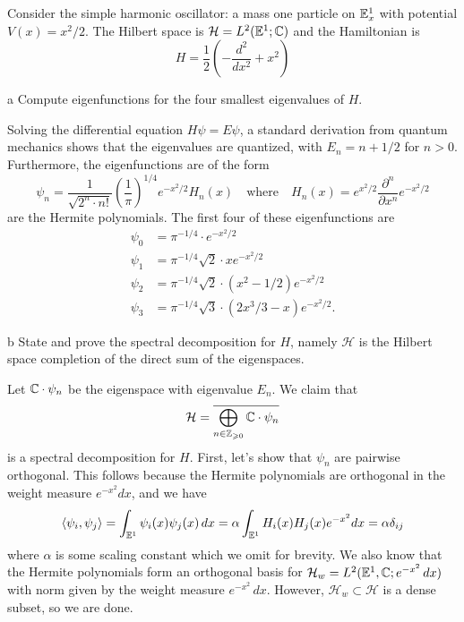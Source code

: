 \documentclass{pset}
\begin{document}
\begin{problem}{2}
  Consider the simple harmonic oscillator: a mass one particle on $\mathbb{E}_x^1$ with potential $V(x) = x^2 /2$. The Hilbert space is $\mathcal{H} = L^2(\mathbb{E}^1; \mathbb{C})$ and the Hamiltonian is
  \[H = \frac{1}{2}\left(-\frac{d^2}{dx^2} + x^2\right)\]
\end{problem}

\begin{parts}
  \begin{part}{a}
    Compute eigenfunctions for the four smallest eigenvalues of $H$.
  \end{part}

  Solving the differential equation $H\psi = E\psi$, a standard derivation from quantum mechanics shows that the eigenvalues are quantized, with $E_n = n+1/2$ for $n>0$. Furthermore, the eigenfunctions are of the form
  \[
    \psi_n = \frac{1}{\sqrt{2^n\cdot n!}}\left(\frac{1}{\pi}\right)^{1/4} e^{-x^2/2} H_n(x)\quad\textrm{where}\quad H_n(x) = e^{x^2/2}\frac{\partial^n}{\partial x^n} e^{-x^2/2}
  \]
  are the Hermite polynomials. The first four of these eigenfunctions are
  \[
    \begin{aligned}
      \psi_0 &= \pi^{-1/4} \cdot e^{-x^2/2}\\
      \psi_1 &= \pi^{-1/4}\sqrt{2}\cdot x e^{-x^2/2}\\
      \psi_2 &= \pi^{-1/4}\sqrt{2}\cdot (x^2-1/2) e^{-x^2/2}\\
      \psi_3 &= \pi^{-1/4}\sqrt{3}\cdot (2x^3/3 - x)e^{-x^2/2}.
    \end{aligned}
  \]

  \begin{part}{b}
    State and prove the spectral decomposition for $H$, namely $\mathcal{H}$ is the Hilbert space completion of the direct sum of the eigenspaces.
  \end{part}
  Let $\mathbb{C}\cdot \psi_n$ be the eigenspace with eigenvalue $E_n$. We claim that
  \[
    \mathcal{H} = \overline{\bigoplus_{n\in \mathbb{Z}_{\geqslant 0}} \mathbb{C} \cdot \psi_n}
  \]
  is a spectral decomposition for $H$. First, let's show that $\psi_n$ are pairwise orthogonal. This follows because the Hermite polynomials are orthogonal in the weight measure $e^{-x^2} dx$, and we have
  \[
    \langle\psi_i, \psi_j\rangle = \int_{\mathbb{E}^1} \psi_i(x)\psi_j(x) \,dx = \alpha\int_{\mathbb{E}^1} H_i(x)H_j(x) e^{-x^2} dx = \alpha\delta_{ij}
  \]
  where $\alpha$ is some scaling constant which we omit for brevity. We also know that the Hermite polynomials form an orthogonal basis for $\mathcal{H}_w=L^2(\mathbb{E}^1, \mathbb{C}; e^{-x^2}\,dx)$ with norm given by the weight measure $e^{-x^2}\,dx$. However, $\mathcal{H}_w \subset \mathcal{H}$ is a dense subset, so we are done.


\end{parts}
\end{document}
